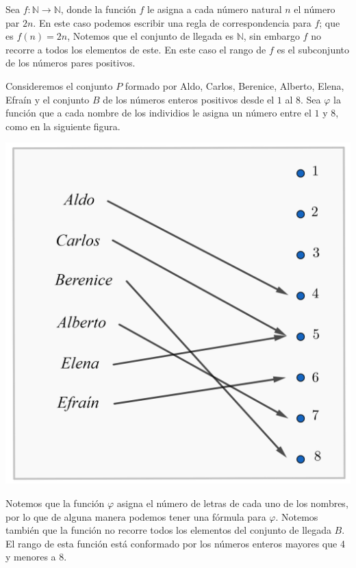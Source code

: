 \begin{ejemplo}
Sea $f: \mathbb{N} \longrightarrow \mathbb{N}$, donde la función $f$ le asigna a cada número natural $n$ el número par $2n$. En este caso podemos escribir una regla de correspondencia para $f$; que es $f(n)=2n$, Notemos que el conjunto de llegada es $\mathbb{N}$, sin embargo $f$ no recorre a todos los elementos de este. En este caso el rango de $f$ es el subconjunto de los números pares positivos.
\end{ejemplo}

\begin{ejemplo}
Consideremos el conjunto $P$ formado por Aldo, Carlos, Berenice, Alberto, Elena, Efraín y el conjunto $B$ de los números enteros positivos desde el $1$ al $8$. Sea $\varphi$ la función que a cada nombre de los individios le asigna un número entre el $1$ y $8$, como en la siguiente figura.
\begin{center}
    \includegraphics[scale=0.2]{Imagenes/IMG2/S1-2-01.png}
\end{center}

Notemos que la función $\varphi$ asigna el número de letras de cada uno de los nombres, por lo que de alguna manera podemos tener una fórmula para $\varphi$. Notemos también que la función no recorre todos los elementos del conjunto de llegada $B$. El rango de esta función está conformado por los números enteros mayores que 4 y menores a 8.
\end{ejemplo}



